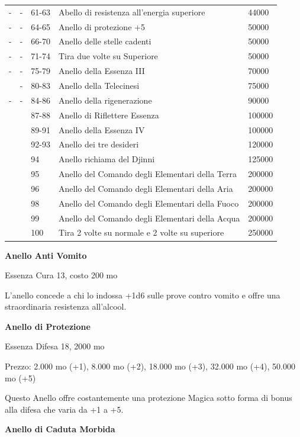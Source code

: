 \documentclass[a4paper,11pt,twoside,openany]{book}
\begin{document}
{\begin{tabular}{L{2cm} L{2cm} L{2cm} L{8cm} L{2cm}}
- & - & 61-63 & Abello di resistenza all'energia superiore & 44000\tabularnewline
- & - & 64-65 & Anello di protezione +5 & 50000\tabularnewline
- & - & 66-70 & Anello delle stelle cadenti  & 50000\tabularnewline
- & - & 71-74 & Tira due volte su Superiore & 50000\tabularnewline
- & - & 75-79 & Anello della Essenza III & 70000\tabularnewline
 & - & 80-83 & Anello della Telecinesi  & 75000\tabularnewline
- & - & 84-86 & Anello della rigenerazione & 90000\tabularnewline
 & & 87-88 & Anello di Riflettere Essenza & 100000\tabularnewline
 & & 89-91 & Anello della Essenza IV & 100000\tabularnewline
 & & 92-93 & Anello dei tre desideri  & 120000\tabularnewline
 & & 94 & Anello richiama del Djinni  & 125000\tabularnewline
 & & 95 & Anello del Comando degli Elementari della Terra & 200000\tabularnewline
 & & 96 & Anello del Comando degli Elementari della Aria & 200000\tabularnewline
 & & 98 & Anello del Comando degli Elementari della Fuoco  & 200000\tabularnewline
 & & 99 & Anello del Comando degli Elementari della Acqua  & 200000\tabularnewline
 & & 100 & Tira 2 volte su normale e 2 volte su superiore & 250000\tabularnewline

\end{tabular}

\pagebreak

\textbf{Anello Anti Vomito}

Essenza Cura 13, costo 200 mo

L'anello concede a chi lo indossa +1d6 sulle prove contro vomito e offre una straordinaria resistenza all'alcool.

\textbf{Anello di Protezione}

Essenza Difesa 18, 2000 mo

Prezzo: 2.000 mo (+1), 8.000 mo (+2), 18.000 mo (+3), 32.000 mo (+4),
50.000 mo (+5)

Questo Anello offre costantemente una protezione Magica sotto forma di bonus alla difesa che varia da +1 a +5.

\textbf{Anello di Caduta Morbida}

}
\end{document}
